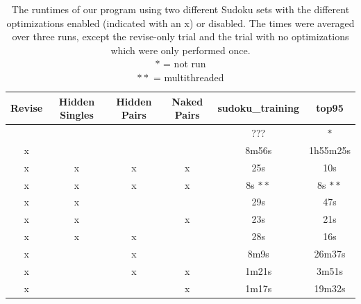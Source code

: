 \documentclass[11pt]{article} %
\begin{document}
\begin{table}[htbp]
\begin{center}
\begin{tabular}{c c c c c c}
\hline
 Revise & Hidden Singles & Hidden Pairs & Naked Pairs & sudoku\_training & top95 \\
\hline
 &  &  &  & ??? & $*$ \\ %
x &  &  &  & 8m56s & 1h55m25s \\ %
x & x & x & x & 25s & 10s \\ %
x & x & x & x & 8s $**$ & 8s $**$ \\ 
x & x &  &  & 29s & 47s \\ %
x & x &  & x & 23s & 21s \\ %
x & x & x &  & 28s & 16s \\ %
x &   & x &  & 8m9s & 26m37s \\ %
x &   & x & x & 1m21s & 3m51s \\ %
x &  &  & x & 1m17s & 19m32s \\ %
\hline
\end{tabular}
\end{center}
\caption{The runtimes of our program using two different Sudoku sets with the different optimizations enabled (indicated with an x) or disabled. The times were averaged over three runs, except the revise-only trial and the trial with no optimizations which were only performed once.\\ $*$ = not run \\ $**$ = multithreaded}
\label{tab:tech_results}
\end{table}
\end{document}
